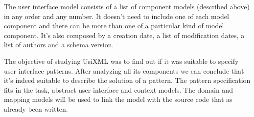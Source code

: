 The user interface model consists of a list of component models (described above) in any order and any number. It doesn't need to include one of each model component and there can be more than one of a particular kind of model component. It's also composed by a creation date, a list of modification dates, a list of authors and a schema version.

The objective of studying UsiXML was to find out if it was suitable to specify user interface patterns. After analyzing all its components we can conclude that it's indeed suitable to describe the solution of a pattern. The pattern specification fits in the task, abstract user interface and context models. The domain and mapping models will be used to link the model with the source code that as already been written.


